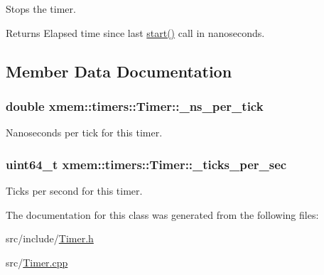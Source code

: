 Stops the timer. 

\begin{DoxyReturn}{Returns}
Elapsed time since last \hyperlink{classxmem_1_1timers_1_1_timer_af94a88fb78dd9edf299d4421e17f5fb3}{start()} call in nanoseconds. 
\end{DoxyReturn}


\subsection{Member Data Documentation}
\hypertarget{classxmem_1_1timers_1_1_timer_a9c737c0df71e4cff93b6fd8dc20595ba}{}
\subsubsection[{\+\_\+ns\+\_\+per\+\_\+tick}]{\setlength{\rightskip}{0pt plus 5cm}double xmem\+::timers\+::\+Timer\+::\+\_\+ns\+\_\+per\+\_\+tick\hspace{0.3cm}{\ttfamily [protected]}}\label{classxmem_1_1timers_1_1_timer_a9c737c0df71e4cff93b6fd8dc20595ba}
Nanoseconds per tick for this timer. \hypertarget{classxmem_1_1timers_1_1_timer_ac038322b59bb4d8df046dedfe6844045}{}
\subsubsection[{\+\_\+ticks\+\_\+per\+\_\+sec}]{\setlength{\rightskip}{0pt plus 5cm}uint64\+\_\+t xmem\+::timers\+::\+Timer\+::\+\_\+ticks\+\_\+per\+\_\+sec\hspace{0.3cm}{\ttfamily [protected]}}\label{classxmem_1_1timers_1_1_timer_ac038322b59bb4d8df046dedfe6844045}
Ticks per second for this timer. 

The documentation for this class was generated from the following files\+:\begin{DoxyCompactItemize}
\item 
src/include/\hyperlink{_timer_8h}{Timer.\+h}\item 
src/\hyperlink{_timer_8cpp}{Timer.\+cpp}\end{DoxyCompactItemize}

